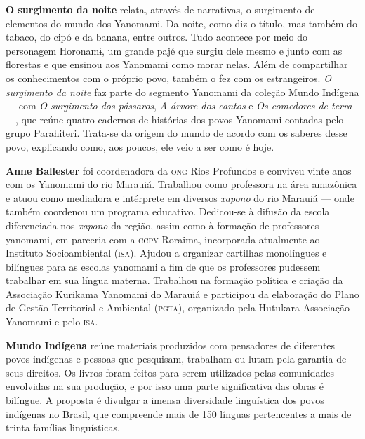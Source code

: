 \textbf{O surgimento da noite} relata, através de narrativas, o surgimento de elementos do mundo dos Yanomami. Da noite, como diz o título, mas também do tabaco, do cipó e da banana, entre outros. Tudo acontece por meio do personagem Horonamɨ, um grande pajé que surgiu dele mesmo e junto com as florestas e que ensinou aos Yanomami como morar nelas. Além de compartilhar os conhecimentos com o próprio povo, também o fez com os estrangeiros. \textit{O surgimento da noite} faz parte do segmento Yanomami da coleção Mundo Indígena --- com \textit{O surgimento dos pássaros}, \textit{A árvore dos cantos} e \textit{Os comedores de terra} ---, que reúne quatro cadernos de histórias dos povos Yanomami contadas pelo grupo Parahiteri. Trata-se da origem do mundo de acordo com os saberes desse povo, explicando como, aos poucos, ele veio a ser como é hoje.

\textbf{Anne Ballester} foi coordenadora da \textsc{ong} Rios Profundos e conviveu vinte anos com os Yanomami do rio Marauiá. Trabalhou como professora na área amazônica e atuou como mediadora e intérprete em diversos \textit{xapono} do rio Marauiá --- onde também coordenou um programa educativo. Dedicou-se à difusão da escola diferenciada nos \textit{xapono} da região, assim como à formação de professores yanomami, em parceria com a \textsc{ccpy} Roraima, incorporada atualmente ao Instituto Socioambiental (\textsc{isa}). Ajudou a organizar cartilhas monolíngues e bilíngues para as escolas yanomami a fim de que os professores pudessem trabalhar em sua língua materna. Trabalhou na formação política e criação da Associação Kurikama Yanomami do Marauiá e participou da elaboração do Plano de Gestão Territorial e Ambiental (\textsc{pgta}), organizado pela Hutukara Associação Yanomami e pelo \textsc{isa}.

\textbf{Mundo Indígena} reúne materiais produzidos com pensadores de diferentes povos indígenas e pessoas que pesquisam, trabalham ou lutam pela garantia de seus direitos. Os livros foram feitos para serem utilizados pelas comunidades envolvidas na sua produção, e por isso uma parte significativa das obras é bilíngue. A proposta é divulgar a imensa diversidade linguística dos povos indígenas no Brasil, que compreende mais de 150 línguas pertencentes a mais de trinta famílias linguísticas.



